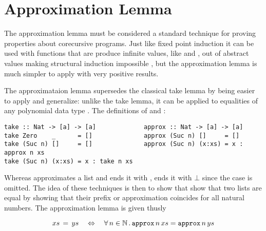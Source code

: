 
\section{Approximation Lemma}

The approximation lemma must be considered a standard technique for
proving properties about corecursive programs. Just like fixed point
induction it can be used with functions that are produce infinite
values, like  and , out of abstract values
making structural induction impossible \cite{corecursive}, but the
approximation lemma is much simpler to apply with very positive
results.

The approximataion lemma supersedes the classical take lemma
\cite{introfp} by being easier to apply and generalize: unlike the
take lemma, it can be applied to equalities of any polynomial
data type \cite{genapprox}. The definitions of  and
: %



\begin{verbatim}
take :: Nat -> [a] -> [a]             approx :: Nat -> [a] -> [a]
take Zero    _      = []              approx (Suc n) []     = []
take (Suc n) []     = []              approx (Suc n) (x:xs) = x : approx n xs
take (Suc n) (x:xs) = x : take n xs
\end{verbatim}

Whereas  approximates a list and ends it with \hs{[]},
 ends it with $\bot$ since the  case is
omitted. The idea of these techniques is then to show that show that
two lists are equal by showing that their prefix or approximation
coincides for all natural numbers. The approximation lemma is given thusly

\begin{equation}
\label{eq:approxeq}
xs \, = \, ys \quad \Leftrightarrow \quad \fa{n \in \mathbb{N}} \hs{approx} \, n \, xs = \hs{approx} \, n \, ys
\end{equation}

